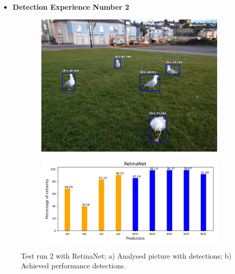       \newpage

      
  \begin{itemize}
    \item \textbf{Detection Experience Number 2}
  \end{itemize}

    

      \begin{figure}[H]
        \centering
        \captionsetup{justification=centering}

        \begin{subfigure}{0.29\textwidth}
        \includegraphics[width=\textwidth]{Sections/4InitialWork/4_images_obj_run3/retinaNet.jpg} 
        \caption{}
        \end{subfigure}
        \begin{subfigure}{0.65\textwidth}
        \includegraphics[width=\textwidth]{Sections/4InitialWork/4_images_obj_run3/retinaNet_graph.png}
        \caption{}
        \end{subfigure}
        
        \caption[Test run 2 with RetinaNet]{ 
        Test run 2 with RetinaNet; a) Analysed picture with detections; b) Achieved performance detections. }
        \end{figure}



